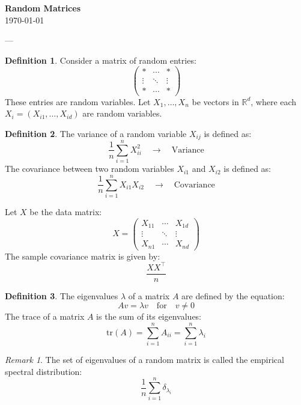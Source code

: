 \documentclass[11pt]{article}
\theoremstyle{definition}
\newtheorem{definition}{Definition}[section]
\theoremstyle{remark}
\newtheorem{remark}{Remark}[section]
\begin{document}
\begin{center}
{\Large\textbf{Random Matrices}}\\
\vspace{0.3cm}
{\normalsize\today}
\end{center}
\vspace{0.5cm}


---

\begin{definition}\label{def:random_matrix}
Consider a matrix of random entries:
\[
\begin{pmatrix}
* & \cdots & * \\
\vdots & \ddots & \vdots \\
* & \cdots & *
\end{pmatrix}
\]
These entries are random variables. Let \(X_1, \ldots, X_n\) be vectors in \(\mathbb{R}^d\), where each \(X_i = (X_{i1}, \ldots, X_{id})\) are random variables.
\end{definition}

\begin{definition}\label{def:variance_covariance}
The variance of a random variable \(X_{ij}\) is defined as:
\[
\frac{1}{n} \sum_{i=1}^n X_{ii}^2 \quad \longrightarrow \quad \text{Variance}
\]
The covariance between two random variables \(X_{i1}\) and \(X_{i2}\) is defined as:
\[
\frac{1}{n} \sum_{i=1}^n X_{i1} X_{i2} \quad \longrightarrow \quad \text{Covariance}
\]
\end{definition}

Let \(X\) be the data matrix:
\[
X = \begin{pmatrix}
X_{11} & \cdots & X_{1d} \\
\vdots & \ddots & \vdots \\
X_{n1} & \cdots & X_{nd}
\end{pmatrix}
\]
The sample covariance matrix is given by:
\[
\frac{XX^\top}{n}
\]

\begin{definition}\label{def:eigenvalues}
The eigenvalues \(\lambda\) of a matrix \(A\) are defined by the equation:
\[
Av = \lambda v \quad \text{for} \quad v \neq 0
\]
The trace of a matrix \(A\) is the sum of its eigenvalues:
\[
\text{tr}(A) = \sum_{i=1}^n A_{ii} = \sum_{i=1}^n \lambda_i
\]
\end{definition}

\begin{remark}\label{rem:spectral_distribution}
The set of eigenvalues of a random matrix is called the empirical spectral distribution:
\[
\frac{1}{n} \sum_{i=1}^n \delta_{\lambda_i}
\]
\end{remark}
\end{document}
